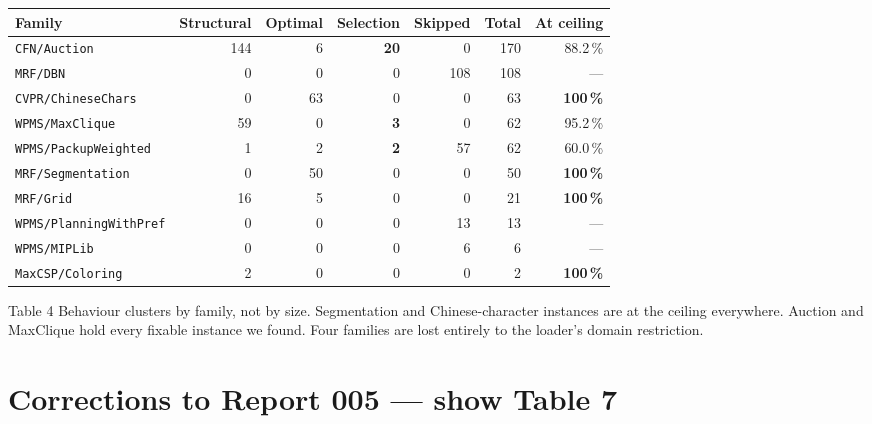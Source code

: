 \documentclass[11pt,a4paper]{article}
\newcommand{\good}[1]{\textcolor{okgreen}{\textbf{#1}}}
\newcommand{\neut}[1]{\textcolor{amber}{\textbf{#1}}}
\begin{document}
\begin{center}
\begin{tabular}{@{}lrrrrrr@{}}
\toprule
Family & Structural & Optimal & Selection & Skipped & Total & At ceiling \\
\midrule
\texttt{CFN/Auction}          & 144 &  6 & \neut{20} &   0 & 170 & 88.2\,\% \\
\texttt{MRF/DBN}              &   0 &  0 &  0 & 108 & 108 & --- \\
\texttt{CVPR/ChineseChars}    &   0 & 63 &  0 &   0 &  63 & \good{100\,\%} \\
\texttt{WPMS/MaxClique}       &  59 &  0 & \neut{3} &   0 &  62 & 95.2\,\% \\
\texttt{WPMS/PackupWeighted}  &   1 &  2 & \neut{2} &  57 &  62 & 60.0\,\% \\
\texttt{MRF/Segmentation}     &   0 & 50 &  0 &   0 &  50 & \good{100\,\%} \\
\texttt{MRF/Grid}             &  16 &  5 &  0 &   0 &  21 & \good{100\,\%} \\
\texttt{WPMS/PlanningWithPref}&   0 &  0 &  0 &  13 &  13 & --- \\
\texttt{WPMS/MIPLib}          &   0 &  0 &  0 &   6 &   6 & --- \\
\texttt{MaxCSP/Coloring}      &   2 &  0 &  0 &   0 &   2 & \good{100\,\%} \\
\bottomrule
\end{tabular}
\end{center}

\begin{say}{Table 4}
Behaviour clusters by family, not by size. Segmentation and Chinese-character instances are at the
ceiling everywhere. Auction and MaxClique hold every fixable instance we found. Four families are
lost entirely to the loader's domain restriction.
\end{say}

\section{Corrections to Report 005 --- show Table 7}
\end{document}
